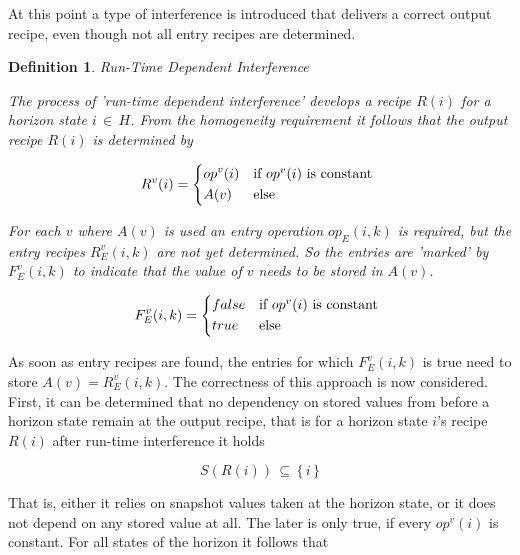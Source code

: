 \documentclass[12pt,a4paper]{scrartcl}
\newtheorem{definition}{Definition}
\begin{document}
At this point a type of interference is introduced that delivers a correct
output recipe, even though not all entry recipes are determined.

\begin{definition}
Run-Time Dependent Interference

The process of 'run-time dependent interference' develops a recipe $R(i)$ for a
horizon state $i\,\in\,H$.  From the homogeneity requirement it follows that
the output recipe $R(i)$ is determined by 
          
\begin{equation}
    R^v(i) = \begin{dcases*}
              op^v(i) & if $op^v(i)$ is constant \\
              A(v)    & else
             \end{dcases*}
\end{equation}

For each $v$ where $A(v)$ is used an entry operation $op_E(i,k)$ is required,
but the entry recipes $R_E^v(i,k)$ are not yet determined. So the entries are
'marked' by $F_E^v(i,k)$ to indicate that the value of $v$ needs to be
stored in $A(v)$.

\begin{equation}
    F_E^v(i,k) = \begin{dcases*}
                     false & if $op^v(i)$ is constant \\
                     true  & else
                 \end{dcases*}
\end{equation}

\end{definition}

As soon as entry recipes are found, the entries for which $F_E^v(i,k)$ is
true need to store $A(v)=R_E^v(i,k)$. The correctness of this approach is now
considered. First, it can be determined that no dependency on stored values 
from before a horizon state remain at the output recipe, that is for a horizon
state $i$'s recipe $R(i)$ after run-time interference it holds

\begin{equation}
                      S(R(i))\,\subseteq\,\{\,i\,\}
\end{equation}

That is, either it relies on snapshot values taken at the horizon state, or it
does not depend on any stored value at all. The later is only true, if every
$op^v(i)$ is constant. For all states of the horizon it follows that
\end{document}
